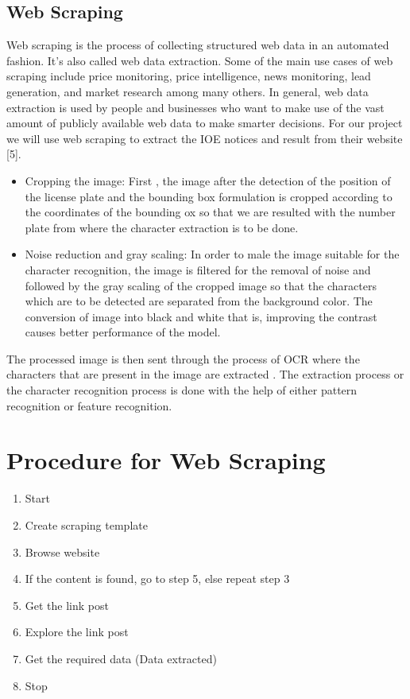\subsection*{ Web Scraping}
Web scraping is the process of collecting structured web data in an automated fashion. 
It’s also called web data extraction. Some of the main use cases of web scraping include 
price monitoring, price intelligence, news monitoring, lead generation, and market 
research among many others. In general, web data extraction is used by people and 
businesses who want to make use of the vast amount of publicly available web data to 
make smarter decisions. For our project we will use web scraping to extract the IOE 
notices and result from their website [5].
\begin{itemize}
	\item Cropping the image: First , the image after the detection of the position of the license plate and the bounding box formulation is cropped according to the coordinates of the bounding ox so that we are resulted with  the number plate from where the character extraction is to be done.
	\item Noise reduction and gray scaling: In order to male the image suitable for the character recognition, the image is filtered for the removal of noise and followed by the gray scaling of the cropped image so that the characters which are to be detected are separated from the background color. The conversion of image into black and white that is, improving the contrast causes better performance of the model.
\end{itemize}
The processed image is then sent through the process of OCR where the characters that are present in the image are extracted . The extraction process or the character recognition process is done with the help of either pattern recognition or feature recognition.
\section*{Procedure for Web Scraping}
\begin{enumerate}
\item Start
\item Create scraping template
\item Browse website
\item If the content is found, go to step 5, else repeat step 3
\item Get the link post
\item Explore the link post
\item Get the required data (Data extracted)
\item Stop
\end{enumerate}

